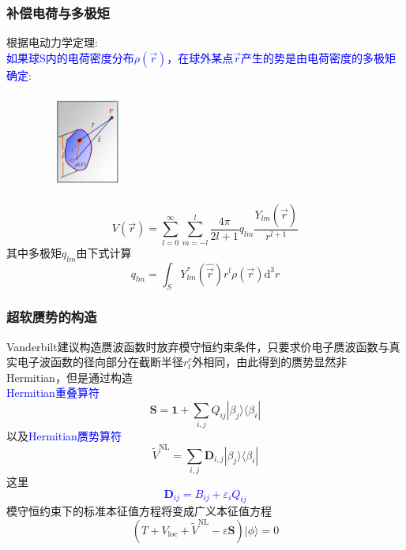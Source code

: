 \frame
{
\frametitle{补偿电荷与多极矩}
根据电动力学定理:\\\textcolor{blue}{如果球\textrm{S}内的电荷密度分布$\rho(\vec r)$，在球外某点$\vec r$产生的势是由电荷密度的多极矩确定}:
\begin{figure}[h!]
\vspace*{-15pt}
\centering
\includegraphics[height=1.25in,width=1.32in,viewport=1 22 507 575,clip]{Figures/potential_multipole.jpg}
\label{Potential-multipole}
\end{figure}
\begin{displaymath}
	V(\vec r)=\sum_{l=0}^{\infty}\sum_{m=-l}^{l}\dfrac{4\pi}{2l+1}q_{lm}\dfrac{Y_{lm}(\hat{\vec r})}{r^{l+1}}
\end{displaymath}
其中多极矩$q_{lm}$由下式计算
\begin{displaymath}
	q_{lm}=\int_SY_{lm}^{\ast}(\hat{\vec r})r^l\rho(\vec r)\mathrm{d}^3r
\end{displaymath}
}

\frame
{
\frametitle{超软赝势的构造}
\textrm{Vanderbilt}建议构造赝波函数时放弃模守恒约束条件，只要求价电子赝波函数与真实电子波函数的径向部分在截断半径$r_{l}^c$外相同，由此得到的赝势显然非\textrm{Hermitian}，但是通过构造\\\textcolor{blue}{\textrm{Hermitian}重叠算符}
\begin{displaymath}
	\mathbf{S}=\mathbf{1}+\sum_{i,j}Q_{ij}|\beta_j\rangle\langle\beta_i|
\end{displaymath}
以及\textcolor{blue}{\textrm{Hermitian}赝势算符}
\begin{displaymath}
	\tilde V^{\mathrm{NL}}=\sum_{i,j}\mathbf{D}_{i,j}|\beta_j\rangle\langle\beta_i|
\end{displaymath}
这里\textcolor{blue}{
\begin{displaymath}
	\mathbf{D}_{ij}=B_{ij}+\varepsilon_iQ_{ij}
\end{displaymath}}
模守恒约束下的标准本征值方程将变成广义本征值方程
\begin{displaymath}
	(T+V_{\mathrm{loc}}+\tilde V^{\mathrm{NL}}-\varepsilon\mathbf{S})|\phi\rangle=0
\end{displaymath}
}

